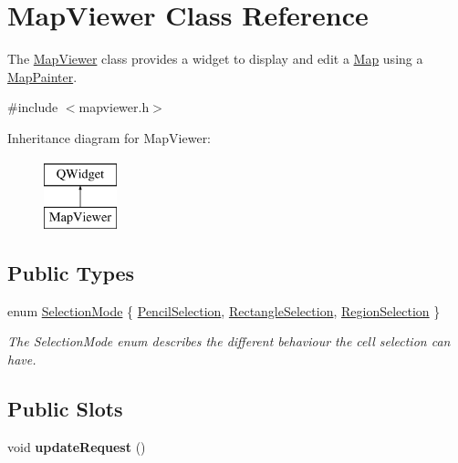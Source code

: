 \hypertarget{class_map_viewer}{}\section{Map\+Viewer Class Reference}
\label{class_map_viewer}


The \hyperlink{class_map_viewer}{Map\+Viewer} class provides a widget to display and edit a \hyperlink{class_map}{Map} using a \hyperlink{class_map_painter}{Map\+Painter}.  




{\ttfamily \#include $<$mapviewer.\+h$>$}

Inheritance diagram for Map\+Viewer\+:\begin{figure}[H]
\begin{center}
\leavevmode
\includegraphics[height=2.000000cm]{class_map_viewer}
\end{center}
\end{figure}
\subsection*{Public Types}
\begin{DoxyCompactItemize}
\item 
enum \hyperlink{class_map_viewer_a8a7a365452e5770c1fab21a9bfb0067d}{Selection\+Mode} \{ \hyperlink{class_map_viewer_a8a7a365452e5770c1fab21a9bfb0067dad92f9b8968a2dac53903589a13c4c898}{Pencil\+Selection}, 
\hyperlink{class_map_viewer_a8a7a365452e5770c1fab21a9bfb0067da551f2219d9274f32ee0d787cca9a0253}{Rectangle\+Selection}, 
\hyperlink{class_map_viewer_a8a7a365452e5770c1fab21a9bfb0067da73f86e7956b7b2b6013ce0e20fa5eea0}{Region\+Selection}
 \}\begin{DoxyCompactList}\small\item\em The Selection\+Mode enum describes the different behaviour the cell selection can have. \end{DoxyCompactList}
\end{DoxyCompactItemize}
\subsection*{Public Slots}
\begin{DoxyCompactItemize}
\item 
\hypertarget{class_map_viewer_af6db4693f536ea5ce8b7b6f05d4099ea}{}\label{class_map_viewer_af6db4693f536ea5ce8b7b6f05d4099ea} 
void {\bfseries update\+Request} ()
\end{DoxyCompactItemize}
